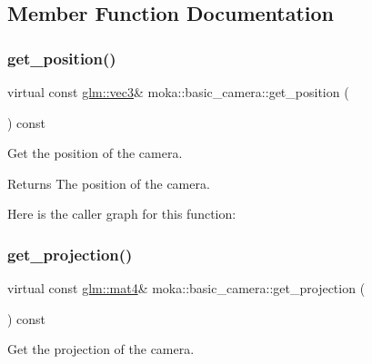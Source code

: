 \subsection{Member Function Documentation}
\mbox{\label{classmoka_1_1basic__camera_afa49b769555a670396d178141376902e}} 
\subsubsection{\texorpdfstring{get\_position()}{get\_position()}}
{\footnotesize\ttfamily virtual const \mbox{\hyperlink{namespacemoka_aed2224bc0e5b79e57a8975ded94ee1aaa97ade28e93c0de60adc075bdbe07ca36}{glm\+::vec3}}\& moka\+::basic\+\_\+camera\+::get\+\_\+position (\begin{DoxyParamCaption}{ }\end{DoxyParamCaption}) const\hspace{0.3cm}{\ttfamily [virtual]}}



Get the position of the camera. 

\begin{DoxyReturn}{Returns}
The position of the camera. 
\end{DoxyReturn}
Here is the caller graph for this function\+:
\mbox{\label{classmoka_1_1basic__camera_a444f348fa7557b80052fa2c2471cd1f8}} 
\subsubsection{\texorpdfstring{get\_projection()}{get\_projection()}}
{\footnotesize\ttfamily virtual const \mbox{\hyperlink{namespacemoka_aed2224bc0e5b79e57a8975ded94ee1aaabe14b41eb96410ea28b32bc138d885ae}{glm\+::mat4}}\& moka\+::basic\+\_\+camera\+::get\+\_\+projection (\begin{DoxyParamCaption}{ }\end{DoxyParamCaption}) const\hspace{0.3cm}{\ttfamily [virtual]}}



Get the projection of the camera. 

